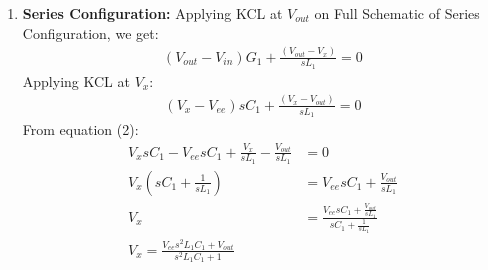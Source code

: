\begin{enumerate}
    \paragraph{Total Parallel Response:}
      \begin{align*}
        V_{out} &= V_{out_1} + V_{out_2} \\
                &= H_1(s)V_{in} + H_2(s)V_{ee} \\
                &= \left(\frac{\frac{1}{sL_1} + sC_1}{G_1 + \frac{1}{sL_1} + sC_1}\right)V_{in} + \left(\frac{G_1}{G_1 + \frac{1}{sL_1} + sC_1}\right)V_{ee} \\
        \boxed{V_{out} = \frac{\left(\frac{1}{sL_1} + sC_1\right)V_{in} + G_1V_{ee}}{G_1 + \frac{1}{sL_1} + sC_1}}
      \end{align*}
  \item \textbf{Series Configuration:}
    Applying KCL at $V_{out}$ on Full Schematic of Series
    Configuration, we get:
    \begin{align*}
      (V_{out} - V_{in})G_1 + \frac{(V_{out} - V_{x})}{sL_1} = 0 \tag{1}
    \end{align*}
    Applying KCL at \(V_{x}\):
    \begin{align*}
      (V_{x} - V_{ee})sC_1 + \frac{(V_{x} - V_{out})}{sL_1} = 0 \tag{2}
    \end{align*}
    From equation (2):
    \begin{align*}
      V_{x}sC_1 - V_{ee}sC_1 + \frac{V_{x}}{sL_1} - \frac{V_{out}}{sL_1} &= 0 \\
      V_{x}\left(sC_1 + \frac{1}{sL_1}\right) &= V_{ee}sC_1 + \frac{V_{out}}{sL_1} \\
      V_{x} &= \frac{V_{ee}sC_1 + \frac{V_{out}}{sL_1}}{sC_1 + \frac{1}{sL_1}} \\
      \boxed{V_{x} = \frac{V_{ee}s^2L_1C_1 + V_{out}}{s^2L_1C_1 + 1}} \tag{3}
    \end{align*}

\end{enumerate}
